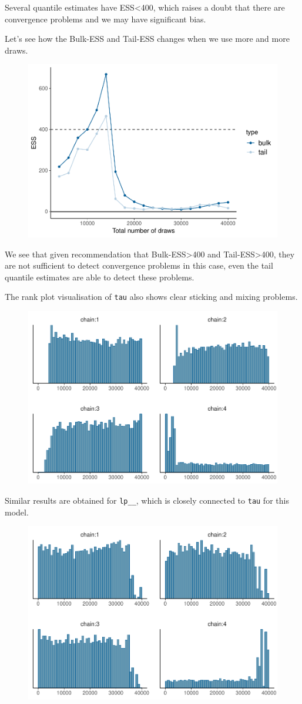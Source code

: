 \documentclass[american,]{article}
\begin{document}
Several quantile estimates have ESS\textless{}400, which raises a doubt
that there are convergence problems and we may have significant bias.

Let's see how the Bulk-ESS and Tail-ESS changes when we use more and
more draws.

\begin{figure}[tp]
  \centering
  \includegraphics[width=0.6\linewidth]{graphics/change-ess-fit-cp2-tau-1.pdf}
\end{figure}

We see that given recommendation that Bulk-ESS\textgreater{}400 and
Tail-ESS\textgreater{}400, they are not sufficient to detect convergence
problems in this case, even the tail quantile estimates are able to
detect these problems.

The rank plot visualisation of \texttt{tau} also shows clear sticking
and mixing problems.

\begin{figure}[tp]
  \centering
  \includegraphics[width=0.6\linewidth]{graphics/hist-fit-cp2-tau-1.pdf}
\end{figure}

Similar results are obtained for \texttt{lp\_\_}, which is closely
connected to \texttt{tau} for this model.

\begin{figure}[tp]
  \centering
  \includegraphics[width=0.6\linewidth]{graphics/hist-fit-cp2-lp-1.pdf}
\end{figure}
\end{document}
